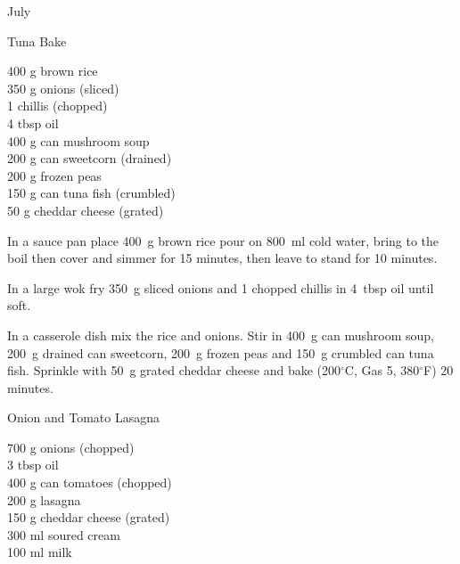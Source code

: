 \begin{menu}{July}
    \begin{recipe}{2}{Tuna Bake}%
		\begin{ingredients}
		400 g brown rice  \\
	350 g onions (sliced) \\
	1  chillis (chopped) \\
	4 tbsp oil  \\
	400 g can mushroom soup  \\
	200 g can sweetcorn (drained) \\
	200 g frozen peas  \\
	150 g can tuna fish (crumbled) \\
	50 g cheddar cheese (grated) \\
	
		\end{ingredients}
	
	
    \begin{instructions}
    \item 
    In a
    sauce pan
    place
    400~g  brown rice
    pour on
    800~ml  cold water,
    bring to the boil then cover and simmer for 15 minutes,
    then leave to stand for 10 minutes.
  \item 
        In a large wok fry
        350~g sliced onions
        and
        1 chopped chillis
        in
        4~tbsp  oil
        until soft.
      \item 
        In a casserole dish mix
        the rice and onions.
        Stir in
        400~g  can mushroom soup,
        200~g drained can sweetcorn,
        200~g  frozen peas
        and
        150~g crumbled can tuna fish.
        Sprinkle with
        50~g grated cheddar cheese
        and
        bake (200$^{\circ}$C, Gas 5, 380$^{\circ}$F) 20 minutes.
      
    \end{instructions}
    \end{recipe}%
  
    \begin{recipe}{2}{Onion and Tomato Lasagna}%
		\begin{ingredients}
		700 g onions (chopped) \\
	3 tbsp oil  \\
	400 g can tomatoes (chopped) \\
	200 g lasagna  \\
	150 g cheddar cheese (grated) \\
	300 ml soured cream  \\
	100 ml milk  \\
	

\end{ingredients}
\end{recipe}
\end{menu}
